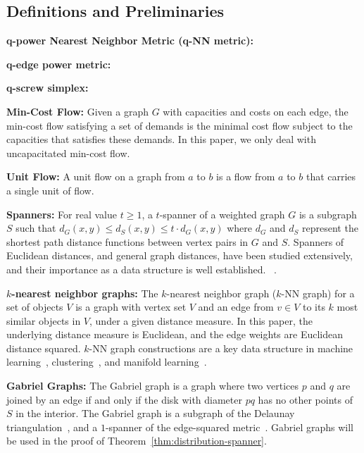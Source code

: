 
\subsection{Definitions and Preliminaries} %
\label{sec:definitions}
\noindent \textbf{q-power Nearest Neighbor Metric (q-NN metric):}

\noindent \textbf{q-edge power metric:}

\noindent \textbf{q-screw simplex:}

\noindent \textbf{Min-Cost Flow:} Given a graph $G$ with capacities and
costs on each edge, the min-cost flow satisfying a set of demands is the
minimal cost flow subject to the capacities that satisfies these demands.
In this paper, we only deal with uncapacitated min-cost flow.

\noindent \textbf{Unit Flow:} A unit flow on a graph from $a$ to $b$ is a
flow from $a$ to $b$ that carries a single unit of flow.

\noindent \textbf{Spanners:} For real value $t \geq 1$, a $t$-spanner of
a weighted graph $G$ is a subgraph $S$ such that $d_G(x,y) \leq d_S(x,y)
\leq t\cdot d_G(x,y)$ where $d_G$ and $d_S$ represent the shortest path
distance functions between vertex pairs in $G$ and $S$. Spanners
of Euclidean distances, and general graph distances, have been
studied extensively, and their importance as a data structure is
well established.
~\cite{Chew1986, Vaidya1991, Callahan1993,HarPeled13}.

\vspace{3 mm}
\noindent \textbf{$k$-nearest neighbor graphs:} The $k$-nearest neighbor graph
($k$-NN graph) for a set of objects $V$ is a graph with vertex set $V$
and an edge from $v\in V$ to its $k$ most similar objects in $V$, under
a given distance measure. In this paper, the underlying distance
measure is Euclidean, and the edge weights are Euclidean distance
squared.
$k$-NN
graph constructions are a key data structure in machine
learning~\cite{Dong11, Chen11}, clustering~\cite{vL09}, and manifold learning~\cite{tenenbaum00global}.

\vspace{3 mm}
\noindent \textbf{Gabriel Graphs:} The Gabriel graph is a graph where
two vertices $p$ and $q$ are joined by an edge if and only if the disk
with diameter $pq$ has no other points of $S$ in the interior. The
Gabriel graph is a subgraph of the Delaunay
triangulation~\cite{SridharMaster}, and a
$1$-spanner of the edge-squared metric~\cite{SridharMaster}. Gabriel
graphs will be used in the proof of
Theorem~\ref{thm:distribution-spanner}.

